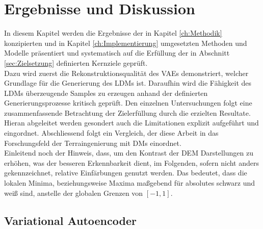 \chapter{Ergebnisse und Diskussion}

In diesem Kapitel werden die Ergebnisse der in Kapitel \ref{ch:Methodik} konzipierten und in Kapitel \ref{ch:Implementierung} umgesetzten Methoden und Modelle präsentiert und systematisch auf die Erfüllung der in Abschnitt \ref{sec:Zielsetzung} definierten Kernziele geprüft. \\
Dazu wird zuerst die Rekonstruktionsqualität des \ac{VAE}s demonstriert, welcher Grundlage für die Generierung des \ac{LDM}s ist. Daraufhin wird die Fähigkeit des \ac{LDM}s überzeugende Samples zu erzeugen anhand der definierten Generierungsprozesse kritisch geprüft. Den einzelnen Untersuchungen folgt eine zusammenfassende Betrachtung der Zielerfüllung durch die erzielten Resultate. Hieran abgeleitet werden gesondert auch die Limitationen explizit aufgeführt und eingordnet. Abschliessend folgt ein Vergleich, der diese Arbeit in das Forschungsfeld der Terraingenierung mit \ac{DM}s einordnet. \\
Einleitend noch der Hinweis, dass, um den Kontrast der \ac{DEM} Darstellungen zu erhöhen, was der besseren Erkennbarkeit dient, im Folgenden, sofern nicht anders gekennzeichnet, relative Einfärbungen genutzt werden. Das bedeutet, dass die lokalen Minima, beziehungsweise Maxima maßgebend für absolutes schwarz und weiß sind, anstelle der globalen Grenzen von $[-1, 1]$.  

\section {Variational Autoencoder}

